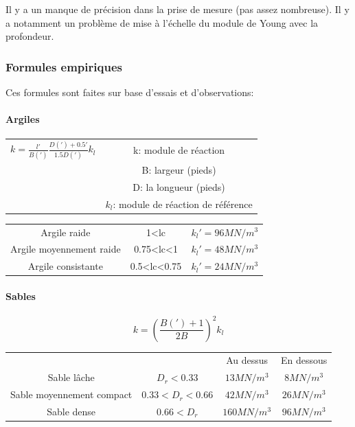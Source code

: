 Il y a un manque de précision dans la prise de mesure (pas assez nombreuse). Il y a notamment un problème de mise à l'échelle du module de Young avec la profondeur.

\subsubsection{Formules empiriques}

Ces formules sont faites sur base d'essais et d'observations:

\paragraph{Argiles}

\begin{center}
\begin{tabular}{c|c}
$k=\frac{l'}{B(')}\frac{D(')+0.5'}{1.5D(')}k_l$
        & k: module de réaction \\
        & B: largeur (pieds) \\
        & D: la longueur (pieds) \\
        & $k_l$: module de réaction de référence 
\end{tabular}
\end{center}

\begin{center}
\begin{tabular}{c|c|c}
    Argile raide                & 1<lc          & $k_l'=96 MN/m^3$\\
    Argile moyennement raide    & 0.75<lc<1     & $k_l'=48 MN/m^3$\\
    Argile consistante          & 0.5<lc<0.75   & $k_l'=24 MN/m^3$
\end{tabular}
\end{center} 
    
\paragraph{Sables}

$$ k=(\frac{B(')+1}{2B})^2 k_l $$

\begin{center}
\begin{tabular}{c|c|c|c}
                                &                       & Au dessus     & En dessous    \\
    Sable lâche                 & $D_r < 0.33$          & $13 MN/m^3$   & $8 MN/m^3$    \\
    Sable moyennement compact   & $0.33 < D_r <0.66$    & $42 MN/m^3$   & $26 MN/m^3$   \\
    Sable dense                 & $0.66 < D_r$          & $160 MN/m^3$  & $96 MN/m^3$   
\end{tabular}
\end{center} 

